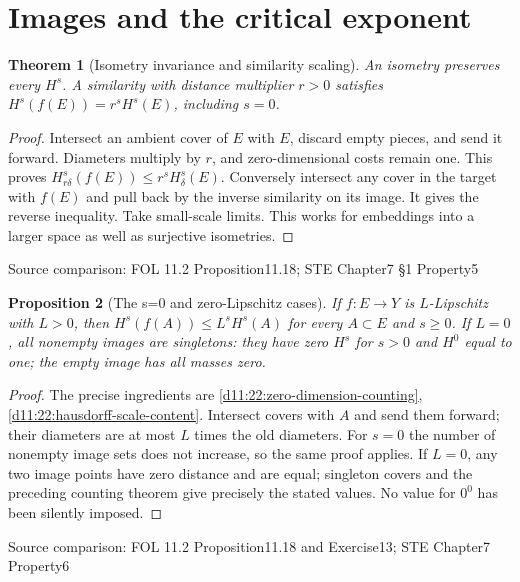 \documentclass[11pt,oneside,openany]{book}
\newtheorem{theorem}{Theorem}[chapter]
\newtheorem{proposition}[theorem]{Proposition}
\theoremstyle{definition}
\theoremstyle{remark}
\newcommand{\family}[1]{}
\newcommand{\source}[1]{\par\begingroup\small\sffamily\color{black!65}Source comparison: #1\par\endgroup}
\begin{document}
\section{Images and the critical exponent}

\begin{theorem}[Isometry invariance and similarity scaling]\family{D11.22.isometry_similarity}\label{d11:22:isometry-similarity}
An isometry preserves every $H^s$. A similarity with distance multiplier $r>0$ satisfies $H^s(f(E))=r^sH^s(E)$, including $s=0$.
\end{theorem}
\begin{proof}
Intersect an ambient cover of $E$ with $E$, discard empty pieces, and send it forward. Diameters multiply by $r$, and zero-dimensional costs remain one. This proves $H^s_{r\delta}(f(E))\le r^sH^s_\delta(E)$. Conversely intersect any cover in the target with $f(E)$ and pull back by the inverse similarity on its image. It gives the reverse inequality. Take small-scale limits. This works for embeddings into a larger space as well as surjective isometries.
\end{proof}
\source{FOL 11.2 Proposition11.18; STE Chapter7 §1 Property5}

\begin{proposition}[The s=0 and zero-Lipschitz cases]\family{D11.22.lipschitz_zero_cases}\label{d11:22:lipschitz-zero-cases}
If $f:E\to Y$ is $L$-Lipschitz with $L>0$, then $H^s(f(A))\le L^sH^s(A)$ for every $A\subset E$ and $s\ge0$. If $L=0$, all nonempty images are singletons: they have zero $H^s$ for $s>0$ and $H^0$ equal to one; the empty image has all masses zero.
\end{proposition}
\begin{proof}
The precise ingredients are \cref{d11:22:zero-dimension-counting}, \cref{d11:22:hausdorff-scale-content}. Intersect covers with $A$ and send them forward; their diameters are at most $L$ times the old diameters. For $s=0$ the number of nonempty image sets does not increase, so the same proof applies. If $L=0$, any two image points have zero distance and are equal; singleton covers and the preceding counting theorem give precisely the stated values. No value for $0^0$ has been silently imposed.
\end{proof}
\source{FOL 11.2 Proposition11.18 and Exercise13; STE Chapter7 Property6}
\end{document}
